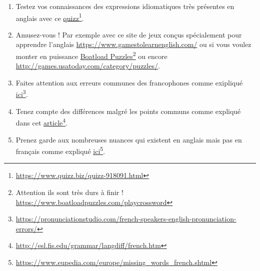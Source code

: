 \begin{enumerate}
  \item Testez vos connaissances des expressions idiomatiques très
    présentes en anglais avec ce    \href{https://www.quizz.biz/quizz-918091.html}{quizz}\footnote{\url{https://www.quizz.biz/quizz-918091.html}}.
  \item Amusez-vous ! Par exemple avec ce site de jeux conçus
    spécialement pour apprendre l'anglais
    \url{https://www.gamestolearnenglish.com/} ou si vous voulez
    monter en puissance
    \href{https://www.boatloadpuzzles.com/playcrossword}{Boatload
      Puzzles}\footnote{Attention ils sont très durs à finir !
      \url{https://www.boatloadpuzzles.com/playcrossword}} ou encore
    \url{http://games.usatoday.com/category/puzzles/}.
  \item Faites attention aux erreurs communes des francophones comme
      exipliqué    \href{https://pronunciationstudio.com/french-speakers-english-pronunciation-errors/}{ici}\footnote{\url{https://pronunciationstudio.com/french-speakers-english-pronunciation-errors/}}.
    \item Tenez compte des différences malgré les points communs
        comme expliqué dans cet        \href{http://esl.fis.edu/grammar/langdiff/french.htm}{article}\footnote{\url{http://esl.fis.edu/grammar/langdiff/french.htm}}.
      \item Prenez garde aux nombreuses nuances qui existent en
        anglais mais pas en français comme expliqué \href{https://www.eupedia.com/europe/missing_words_french.shtml}{ici}\footnote{\url{https://www.eupedia.com/europe/missing_words_french.shtml}}.
\end{enumerate}

\newpage

